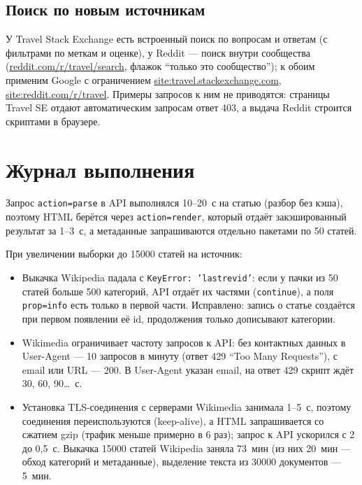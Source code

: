 \subsection{Поиск по новым источникам}
У Travel Stack Exchange есть встроенный поиск по вопросам и ответам (с фильтрами по меткам и оценке), у Reddit --- поиск внутри сообщества (\url{reddit.com/r/travel/search}, флажок \enquote{только это сообщество}); к обоим применим Google с ограничением \url{site:travel.stackexchange.com}, \url{site:reddit.com/r/travel}. Примеры запросов к ним не приводятся: страницы Travel SE отдают автоматическим запросам ответ 403, а выдача Reddit строится скриптами в браузере.

\section{Журнал выполнения}
Запрос \texttt{action=parse} в API выполнялся 10--20~с на статью (разбор без кэша), поэтому HTML берётся через \texttt{action=render}, который отдаёт закэшированный результат за 1--3~с, а метаданные запрашиваются отдельно пакетами по 50 статей.

При увеличении выборки до 15000 статей на источник:
\begin{itemize}
    \item Выкачка Wikipedia падала с \texttt{KeyError: 'lastrevid'}: если у пачки из 50 статей больше 500 категорий, API отдаёт их частями (\texttt{continue}), а поля \texttt{prop=info} есть только в первой части. Исправлено: запись о статье создаётся при первом появлении её id, продолжения только дописывают категории.
    \item Wikimedia ограничивает частоту запросов к API: без контактных данных в User-Agent --- 10 запросов в минуту (ответ 429 \enquote{Too Many Requests}), с email или URL --- 200. В User-Agent указан email, на ответ 429 скрипт ждёт 30, 60, 90\ldots~с.
    \item Установка TLS-соединения с серверами Wikimedia занимала 1--5~с, поэтому соединения переиспользуются (keep-alive), а HTML запрашивается со сжатием gzip (трафик меньше примерно в 6 раз); запрос к API ускорился с 2 до 0,5~с. Выкачка 15000 статей Wikipedia заняла 73~мин (из них 20~мин --- обход категорий и метаданные), выделение текста из 30000 документов --- 5~мин.
\end{itemize}

